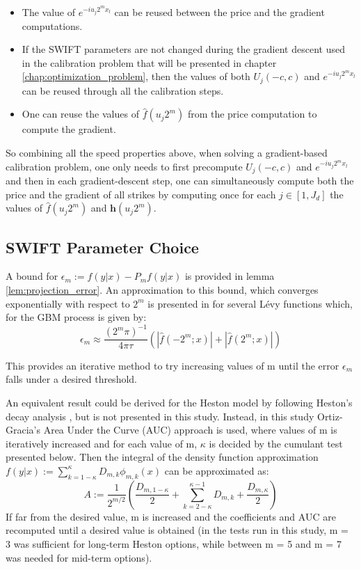 \documentclass[12,twoside]{mammeTFM}
\theoremstyle{definition}
\theoremstyle{remark}
\begin{document}
\begin{itemize}
\item The value of $e^{-i u_j 2^m x_l}$ can be reused between the price and the gradient computations.
\item If the SWIFT parameters are not changed during the gradient descent used in the calibration problem that will be presented in chapter \ref{chap:optimization_problem}, then the values of both $U_j(-c,c)$ and $e^{-i u_j 2^m x_l}$ can be reused through all the calibration steps.
\item One can reuse the values of $\hat{f}(u_j 2^m)$ from the price computation to compute the gradient. 
\end{itemize}
So combining all the speed properties above, when solving a gradient-based calibration problem, one only needs to first precompute $U_j(-c,c)$ and $e^{-i u_j 2^m x_l}$ and then in each gradient-descent step, one can simultaneously compute both the price and the gradient of all strikes by computing once for each $j \in [1, J_d]$ the values of $\hat{f}(u_j 2^m)$ and $\boldsymbol{h}(u_j 2^m)$.

\subsection{SWIFT Parameter Choice} \label{subsec:approximation_error}

A bound for $\epsilon_m := f(y|x) - P_mf(y|x)$ is provided in lemma \ref{lem:projection_error}. An approximation to this bound, which converges exponentially with respect to $2^m$ is presented in \cite{mar17} for several L\'evy functions which, for the GBM process is given by:
\begin{equation}
\epsilon_m \approx \dfrac{(2^m \pi)^{-1}}{4 \pi \tau}\left( \left| \hat{f}(-2^m;x) \right| + \left| \hat{f}(2^m;x)\right| \right)
\end{equation}

This provides an iterative method to try increasing values of m until the error $\epsilon_m$ falls under a desired threshold.

An equivalent result could be derived for the Heston model by following Heston's decay analysis \cite{hes93}, but is not presented in this study. Instead, in this study Ortiz-Gracia's Area Under the Curve (AUC) \cite{Ortiz-Gracia2016} approach is used, where values of m is iteratively increased and for each value of m, $\kappa$ is decided by the cumulant test presented below. Then the integral of the density function approximation $f(y|x) := \sum_{k = 1 - \kappa}^{\kappa} D_{m,k}\phi_{m,k}(x)$ can be approximated as:
\begin{equation}
A := \dfrac{1}{2^{m/2}}\left( \dfrac{D_{m, 1 - \kappa}}{2} + \sum_{k = 2 - \kappa}^{\kappa - 1} D_{m, k} + \dfrac{D_{m, \kappa}}{2} \right)
\end{equation}
If far from the desired value, m is increased and the coefficients and AUC are recomputed until a desired value is obtained (in the tests run in this study, m = 3 was sufficient for long-term Heston options, while between m = 5 and m = 7 was needed for mid-term options).
\end{document}
